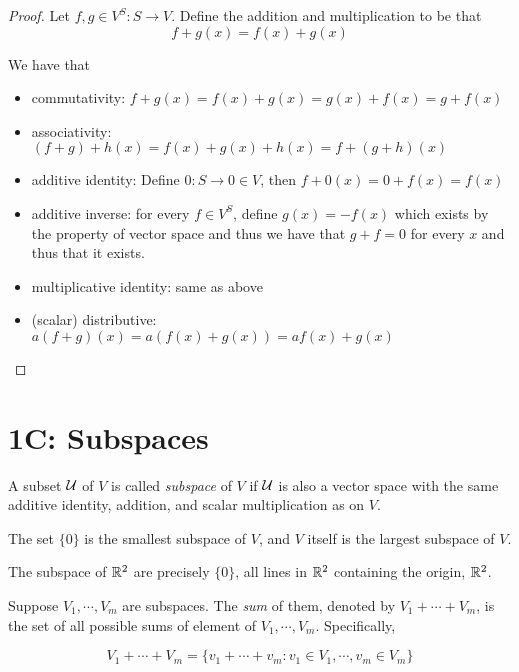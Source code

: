 \documentclass{extarticle}
\begin{document}
\begin{proof}
Let \(f, g \in V^S \colon S \to V\). Define the addition and multiplication to be that 
\[f + g (x) = f(x) + g(x)\]

We have that 
\begin{itemize}
    \item commutativity: \(f + g(x) = f(x) + g(x) = g(x) + f(x) = g+f (x)\)
    \item associativity: \((f + g)+h (x) = f(x) + g(x) + h(x) = f + (g + h)(x)\)
    \item additive identity: Define \(0\colon S \to 0 \in V\), then \(f+0(x) = 0 + f(x) = f(x)\)
    \item additive inverse: for every \(f \in V^S\), define \(g(x) = -f(x)\) which exists
    by the property of vector space and thus we have that \(g + f = 0\) for every \(x\)
    and thus that it exists. 
    \item multiplicative identity: same as above 
    \item (scalar) distributive: \(a(f+g)(x) = a(f(x) + g(x)) = af(x)+g(x)\)
\end{itemize}
\end{proof}

\newpage 
\section*{1C: Subspaces}

\begin{definition}[subspace]
    A subset \(\mathcal{U}\) of \(V\) is called \emph{subspace} of \(V\) if \(\mathcal{U}\)
    is also a vector space with the same additive identity, addition, and 
    scalar multiplication as on \(V\). 
\end{definition}

\begin{remark}
    The set \(\{0\}\) is the smallest subspace of \(V\), and \(V\) itself 
    is the largest subspace of \(V\). 
\end{remark}

\begin{remark}
    The subspace of \(\mathbb{R}^2\) are precisely \(\{0\}\), all lines in \(\mathbb{R}^2\)
    containing the origin, \(\mathbb{R}^2\). 
\end{remark}


\begin{definition} 
    Suppose \(V_1, \cdots, V_m\) are subspaces. The \emph{sum} of them, denoted
    by \(V_1 + \cdots + V_m\), is the set of all possible sums of element 
    of \(V_1, \cdots, V_m\). Specifically,

    \[V_1 + \cdots + V_m = \{v_1 + \cdots + v_m \colon v_1 \in V_1, \cdots, v_m \in V_m\}\]
\end{definition}
\end{document}
